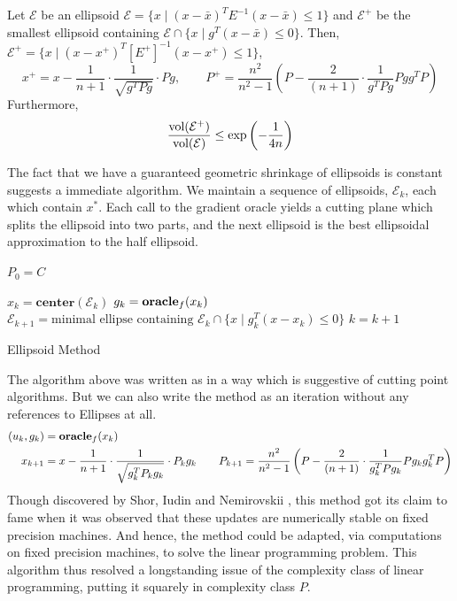 \begin{fact} Let $\mathcal{E}$ be an ellipsoid $
\mathcal{E} = \{ x \mid (x - \bar{x})^T E^{-1} (x - \bar{x}) \leq 1\} 
$ and $\mathcal{E}^+$ be the smallest ellipsoid containing $\mathcal{E} \cap \{ x \mid g^T(x - \bar{x}) \leq 0\}$.
Then, $ \mathcal{E^+} = \{ x \mid (x - x^+)^T[E^+]^{-1} (x - x^+) \leq 1 \} $,
$$
x^{+} =x-\frac{1}{n+1}\cdot\frac{1}{\sqrt{g^{T}Pg}}\cdot Pg, \qquad
P^{+} =\frac{n^{2}}{n^{2}-1}\left(P-\frac{2}{(n+1)}\cdot\frac{1}{g^{T}Pg}Pgg^{T}P\right)
$$
Furthermore, 
$$\frac{\textnormal{vol} (\mathcal{E}^+)}{\textnormal{vol} (\mathcal{E})} \leq \exp\left(-\frac{1}{4n}\right)$$
\end{fact}

The fact that we have a guaranteed geometric shrinkage of ellipsoids is constant suggests
a immediate algorithm. We maintain a sequence of ellipsoids, $\mathcal{E}_k$, each which contain
$x^*$. Each call to the gradient oracle yields a cutting plane which splits the ellipsoid into two parts,
and the next ellipsoid is the best ellipsoidal approximation to the half ellipsoid. 
\begin{algorithm} 
  \SetAlgoNoLine
  \DontPrintSemicolon
  $P_0 = C$\;
  
   {
  \nl $x_{k}  = \mathbf{center}(\mathcal{E}_k)$\;
  \nl $g_k = \mbox{\bf oracle}_f(x_k)$\;
  \nl $\mathcal{E}_{k+1} = \mbox{minimal ellipse containing }\mathcal{E}_k \cap \{x \mid g_k^T(x -x_k) \leq 0 \}$\;
  \nl $k = k + 1$
  }
  \caption{Ellipsoid Method \label{alg:ellipsoid}}
\end{algorithm}

The algorithm above was written as in a way which is suggestive of cutting
point algorithms. But we can also write the method as an iteration without any
references to Ellipses at all.
\begin{align*}
(u_k,g_{k}) & =\mbox{\bf oracle}_f(x_{k})\\
x_{k+1} & =x-\frac{1}{n+1}\cdot\frac{1}{\sqrt{g_{k}^{T}P_{k}g_{k}}}\cdot P_{k}g_{k}\qquad
P_{k+1}  =\frac{n^{2}}{n^{2}-1}\left(P-\frac{2}{(n+1)}\cdot\frac{1}{g_{k}^{T}Pg_{k}}Pg_{k}g_{k}^{T}P\right)
\end{align*}
Though discovered by Shor, Iudin and Nemirovskii \cite{bland1981ellipsoid},
this method got its claim to fame when it was observed that these updates are
numerically stable on fixed precision machines. And hence, the method could
be adapted, via computations on fixed precision machines, to solve the linear
programming problem. This algorithm thus resolved a longstanding issue of the
complexity class of linear programming, putting it squarely in complexity
class $P$.

